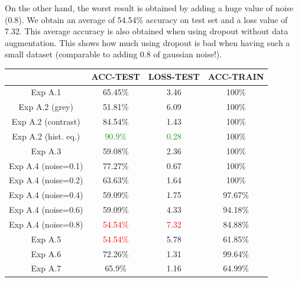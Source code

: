 \documentclass[11pt, openany]{report}
\theoremstyle{plain}
\theoremstyle{definition}
\theoremstyle{remark}
\begin{document}
On the other hand, the worst result is obtained by adding a huge value of noise (0.8). We obtain an average of 54.54\% accuracy on test set and a loss value of 7.32. This average accuracy is also obtained when using dropout without data augmentation. This shows how much using dropout is bad when having such a small dataset (comparable to adding 0.8 of gaussian noise!).  


\begin{center}
\begin{tabular}{|c|c|c|c|}
  \hline
          & \textbf{ACC-TEST} & \textbf{LOSS-TEST} & \textbf{ACC-TRAIN} \\
  \hline
  Exp A.1 & 65.45\% & 3.46 & 100\% \\
  \hline
  Exp A.2 (grey) & 51.81\% & 6.09 & 100\%  \\ 
  Exp A.2 (contrast) & 84.54\% & 1.43 & 100\% \\ 
  Exp A.2 (hist. eq.) & \textcolor{ForestGreen}{90.9\%} & \textcolor{ForestGreen}{0.28} & 100\% \\ 
  \hline
  Exp A.3 & 59.08\% & 2.36 & 100\% \\
  \hline
  Exp A.4 (noise=0.1) & 77.27\% & 0.67 & 100\%  \\ 
  Exp A.4 (noise=0.2) & 63.63\% & 1.64 & 100\% \\ 
  Exp A.4 (noise=0.4) & 59.09\% & 1.75 & 97.67\% \\
  Exp A.4 (noise=0.6) & 59.09\% & 4.33 & 94.18\%  \\ 
  Exp A.4 (noise=0.8) & \textcolor{red}{54.54\%} & \textcolor{red}{7.32} & 84.88\% \\
  \hline 
  Exp A.5 & \textcolor{red}{54.54\%} & 5.78 & 61.85\% \\
  \hline
  Exp A.6 & 72.26\% & 1.31 & 99.64\% \\
  \hline
  Exp A.7 & 65.9\% & 1.16 & 64.99\% \\ 
  \hline
\end{tabular}
\label{table:summary-allidb1}
\end{center}
\end{document}
